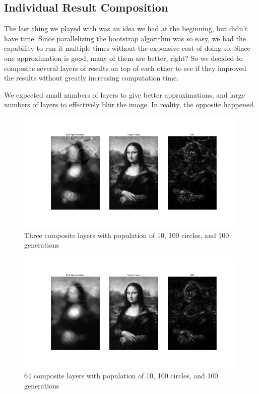 \documentclass{article}
\begin{document}
\subsection{Individual Result Composition}

The last thing we played with was an idea we had at the beginning, but didn't have time. Since
parallelizing the bootstrap algorithm was so easy, we had the capability to run it multiple times
without the expensive cost of doing so. Since one approximation is good, many of them are better,
right? So we decided to composite several layers of results on top of each other to see if they
improved the results without greatly increasing computation time.

We expected small numbers of layers to give better approximations, and large numbers of layers to
effectively blur the image. In reality, the opposite happened.

\begin{figure}[H]
    \centering
    \includegraphics[width=\textwidth]{output/average3_c100p10g100.png}
    \caption{Three composite layers with population of 10, 100 circles, and 100
        generations}\label{fig:composite-3}
\end{figure}

\begin{figure}[H]
    \centering
    \includegraphics[width=\textwidth]{output/average_c100i10g100l64.png}
    \caption{64 composite layers with population of 10, 100 circles, and 100
        generations}\label{fig:composite-64}
\end{figure}
\end{document}
